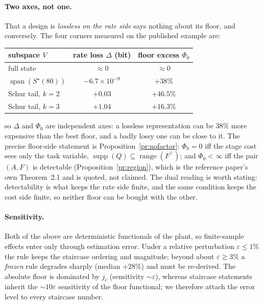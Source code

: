 \paragraph{Two axes, not one.} That a design is \emph{lossless on the rate side}
says nothing about its floor, and conversely. The four corners measured on the
published example are:
\begin{center}\footnotesize
\begin{tabular}{@{}lcc@{}}
\toprule
subspace $V$ & rate loss $\Delta$ (bit) & floor excess $\Phi_0$ \\
\midrule
full state                          & $\approx0$        & $\approx0$ \\
$\operatorname{span}(S^{\star}(80))$ & $-6.7\times10^{-9}$ & $+38\%$ \\
Schur tail, $k=2$                   & $+0.03$           & $+46.5\%$ \\
Schur tail, $k=3$                   & $+1.04$           & $+16.3\%$ \\
\bottomrule
\end{tabular}
\end{center}
so $\Delta$ and $\Phi_0$ are independent axes: a lossless representation can be
$38\%$ more expensive than the best floor, and a badly lossy one can be close to
it. The precise floor-side statement is Proposition~\ref{pr:nofactor}: $\Phi_0=0$
iff the stage cost sees only the task variable,
$\operatorname{supp}(Q)\subseteq\operatorname{range}(F^{\top})$; and
$\Phi_0<\infty$ iff the pair $(A,F)$ is detectable
(Proposition~\ref{pr:region}), which is the reference paper's own Theorem~2.1 and
is quoted, not claimed. The dual reading is worth stating: detectability is what
keeps the rate side finite, and the same condition keeps the cost side finite, so
neither floor can be bought with the other.

\paragraph{Sensitivity.} Both of the above are deterministic functionals of the
plant, so finite-sample effects enter only through estimation error. Under a
relative perturbation $\varepsilon\le1\%$ the rule keeps the staircase ordering and
magnitude; beyond about $\varepsilon\gtrsim3\%$ a \emph{frozen} rule degrades
sharply (median $+28\%$) and must be re-derived. The absolute floor is dominated
by $j_c$ (sensitivity $\sim\varepsilon$), whereas staircase statements inherit the
$\sim10\varepsilon$ sensitivity of the floor functional; we therefore attach the
error level to every staircase number.
